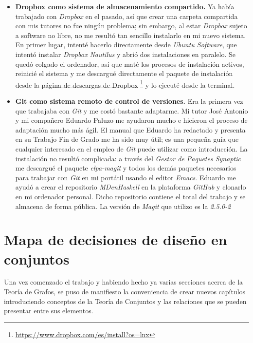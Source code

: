 \begin{itemize}
  \item \textbf{Dropbox como sistema de almacenamiento compartido.} Ya había 
    trabajado con \textit{Dropbox} en el pasado, así que crear una carpeta 
    compartida con mis tutores no fue ningún problema; sin embargo, al estar
    \textit{Dropbox} sujeto a software no libre, no me resultó tan sencillo
    instalarlo en mi nuevo sistema. En primer lugar, intenté hacerlo 
    directamente desde \textit{Ubuntu Software}, que intentó instalar 
    \textit{Dropbox Nautilus} y abrió dos instalaciones en paralelo. Se quedó 
    colgado el ordenador, así que maté los procesos de instalación activos,
    reinicié el sistema y me descargué directamente el paquete de instalación
    desde la 
    \href{https://www.dropbox.com/es/install?os=lnx}
    {página de descargas de Dropbox}
    \footnote{\url{https://www.dropbox.com/es/install?os=lnx}} y lo ejecuté
    desde la terminal.
  \item \textbf{Git como sistema remoto de control de versiones.} Era la 
    primera vez que trabajaba con \textit{Git} y me costó bastante adaptarme.
    Mi tutor José Antonio y mi compañero Eduardo Paluzo me ayudaron mucho e
    hicieron el proceso de adaptación mucho más ágil. 
    El manual que Eduardo ha redactado y presenta en su Trabajo Fin de Grado
    me ha sido muy útil; es una pequeña guía que cualquier interesado en el
    empleo de \textit{Git} puede utilizar como introducción.
    La instalación no resultó complicada: a través del \textit{Gestor de 
    Paquetes Synaptic} me descargué el paquete \textit{elpa-magit} y todos
    los demás paquetes necesarios para trabajar con \textit{Git} en mi
    portátil usando el editor \textit{Emacs}.
    Eduardo me ayudó a crear el repositorio \textit{MDenHaskell} en la 
    plataforma \textit{GitHub} y clonarlo en mi ordenador personal. Dicho
    repositorio contiene el total del trabajo y se almacena de forma pública.
    La versión de \textit{Magit} que utilizo es la \textit{2.5.0-2}
\end{itemize}


\section{Mapa de decisiones de diseño en conjuntos}

Una vez comenzado el trabajo y habiendo hecho ya varias secciones acerca de la
Teoría de Grafos, se puso de manifiesto la conveniencia de crear nuevos 
capítulos introduciendo conceptos de la Teoría de Conjuntos y las relaciones
que se pueden presentar entre sus elementos. 

